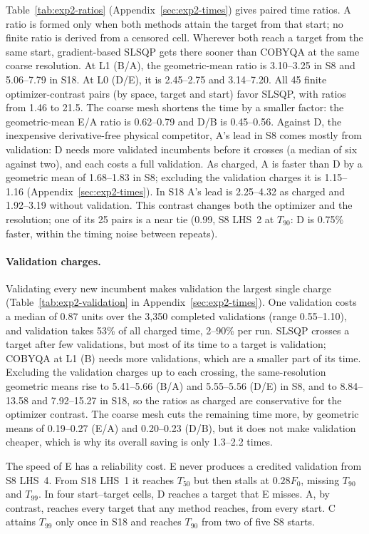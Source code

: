 Table~\ref{tab:exp2-ratios} (Appendix~\ref{sec:exp2-times}) gives paired time ratios. A ratio is formed
only when both methods attain the target from that start; no finite ratio
is derived from a censored cell. Wherever both reach a target from the
same start, gradient-based SLSQP gets there sooner than COBYQA at the same
coarse resolution. At L1 (B/A), the geometric-mean ratio is 3.10--3.25 in
S8 and 5.06--7.79 in S18. At L0 (D/E), it is 2.45--2.75 and
3.14--7.20.
All 45 finite optimizer-contrast pairs (by space, target and start) favor
SLSQP, with ratios from 1.46 to 21.5. The coarse mesh shortens the time by
a smaller factor: the geometric-mean E/A ratio is 0.62--0.79 and D/B is
0.45--0.56. Against D, the inexpensive derivative-free physical
competitor, A's lead in S8 comes mostly from validation: D needs more
validated incumbents before it crosses (a median of six against two), and
each costs a full validation. As charged, A is faster than D by a
geometric mean of 1.68--1.83 in S8; excluding the validation charges it is
1.15--1.16 (Appendix~\ref{sec:exp2-times}). In S18 A's lead is 2.25--4.32
as charged and 1.92--3.19 without validation. This contrast changes
both the optimizer and the resolution; one of its 25 pairs is a near tie
(0.99, S8 LHS~2 at $T_{90}$: D is 0.75\% faster, within the timing noise
between repeats).

\paragraph{Validation charges.}
Validating every new incumbent makes validation the largest single
charge (Table~\ref{tab:exp2-validation} in Appendix~\ref{sec:exp2-times}). One validation costs a median of
0.87 units over the 3,350 completed validations (range 0.55--1.10), and
validation takes 53\% of all charged time, 2--90\% per run. SLSQP crosses
a target after few validations, but most of its time to a target is
validation; COBYQA at L1 (B) needs more validations, which are a smaller
part of its time. Excluding the validation charges up to each crossing, the
same-resolution geometric means rise to 5.41--5.66 (B/A) and 5.55--5.56
(D/E) in S8, and to 8.84--13.58 and 7.92--15.27 in S18, so the
ratios as charged are conservative for the optimizer contrast. The coarse
mesh cuts the remaining time more, by geometric means of 0.19--0.27 (E/A)
and 0.20--0.23 (D/B), but it does not make validation cheaper, which is why
its overall saving is only 1.3--2.2 times.

The speed of E has a reliability cost. E never produces a credited
validation from S8 LHS~4. From S18 LHS~1 it reaches $T_{50}$ but
then stalls at $0.28F_0$, missing $T_{90}$ and $T_{99}$. In four
start--target cells, D reaches a target that E misses. A, by contrast,
reaches every target that any method reaches, from every start. C attains
$T_{99}$ only once in S18 and reaches $T_{90}$ from two of five
S8 starts.

